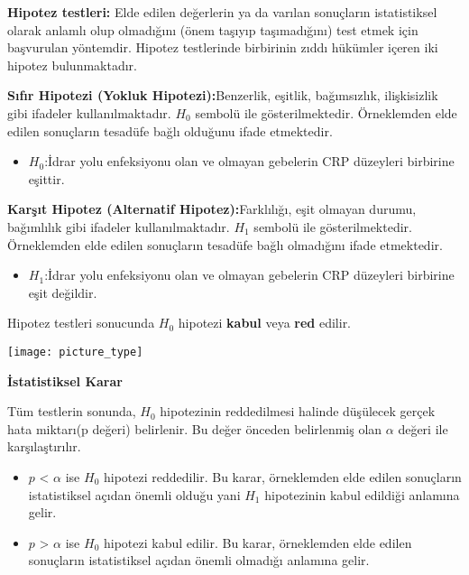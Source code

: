 \documentclass[
]{article}
\providecommand{\tightlist}{%
  \setlength{\itemsep}{0pt}\setlength{\parskip}{0pt}}
\begin{document}
\textbf{Hipotez testleri:} Elde edilen değerlerin ya da varılan
sonuçların istatistiksel olarak anlamlı olup olmadığını (önem taşıyıp
taşımadığını) test etmek için başvurulan yöntemdir. Hipotez testlerinde
birbirinin zıddı hükümler içeren iki hipotez bulunmaktadır.

\textbf{Sıfır Hipotezi (Yokluk Hipotezi):}Benzerlik, eşitlik,
bağımsızlık, ilişkisizlik gibi ifadeler kullanılmaktadır. \(H_0\)
sembolü ile gösterilmektedir. Örneklemden elde edilen sonuçların
tesadüfe bağlı olduğunu ifade etmektedir.

\begin{itemize}
\tightlist
\item
  \(H_0\):İdrar yolu enfeksiyonu olan ve olmayan gebelerin CRP düzeyleri
  birbirine eşittir.
\end{itemize}

\textbf{Karşıt Hipotez (Alternatif Hipotez):}Farklılığı, eşit olmayan
durumu, bağımlılık gibi ifadeler kullanılmaktadır. \(H_1\) sembolü ile
gösterilmektedir. Örneklemden elde edilen sonuçların tesadüfe bağlı
olmadığını ifade etmektedir.

\begin{itemize}
\tightlist
\item
  \(H_1\):İdrar yolu enfeksiyonu olan ve olmayan gebelerin CRP düzeyleri
  birbirine eşit değildir.
\end{itemize}

Hipotez testleri sonucunda \(H_0\) hipotezi \textbf{kabul} veya
\textbf{red} edilir.

\texttt{[image: picture\_type]}

\textbf{İstatistiksel Karar}

Tüm testlerin sonunda, \(H_0\) hipotezinin reddedilmesi halinde
düşülecek gerçek hata miktarı(p değeri) belirlenir. Bu değer önceden
belirlenmiş olan \(\alpha\) değeri ile karşılaştırılır.

\begin{itemize}
\item
  \(p\) \textless{} \(\alpha\) ise \(H_0\) hipotezi reddedilir. Bu
  karar, örneklemden elde edilen sonuçların istatistiksel açıdan önemli
  olduğu yani \(H_1\) hipotezinin kabul edildiği anlamına gelir.
\item
  \(p\) \textgreater{} \(\alpha\) ise \(H_0\) hipotezi kabul edilir. Bu
  karar, örneklemden elde edilen sonuçların istatistiksel açıdan önemli
  olmadığı anlamına gelir.
\end{itemize}
\end{document}
